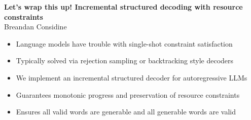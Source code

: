 \documentclass[portrait,a0b,final,a4resizeable]{a0poster}
\begin{document}
  \begin{poster}
    \vspace{-0.3cm}
    \begin{center}
      \begin{pcolumn}{1.03}
        \begin{minipage}[c][9cm][c]{0.85\textwidth}
          \begin{center}
          {\Huge \textbf{Let's wrap this up! Incremental structured decoding with resource constraints}}\\[10mm]
          {\huge Breandan Considine}
          \end{center}
        \end{minipage}
      \end{pcolumn}
    \end{center}

    \vspace*{-0.5cm}

    \large



    \Large

    \begin{multicols}{2}



      \vspace*{-1cm}
      \null\hspace*{2.5cm}\begin{minipage}[c]{0.88\columnwidth}
      \renewcommand\labelitemi{$\vcenter{\hbox{\small$\bullet$}}$}
      \begin{itemize}
        \item {} Language models have trouble with single-shot constraint satisfaction
        \item {} Typically solved via rejection sampling or backtracking style decoders
        \item {} We implement an incremental structured decoder for autoregressive LLMs
        \item {} Guarantees monotonic progress and preservation of resource constraints
        \item {} Ensures all valid words are generable and all generable words are valid
      \end{itemize}
      \end{minipage}


\end{multicols}
\end{poster}
\end{document}
